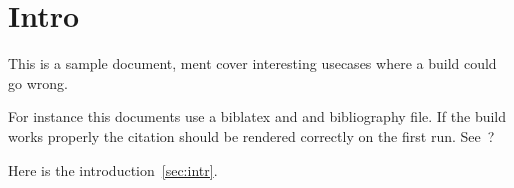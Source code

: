 \documentclass[10pt]{article}
\begin{document}
\section{Intro}\label{sec:intro}
This is a sample document, ment cover interesting usecases where a build could go wrong.

For instance this documents use a biblatex and and bibliography file.
If the build works properly the citation should be rendered correctly on the first run.
See~\cite{shakebuild}?

Here is the introduction~\ref{sec:intr}.

\printbibliography
\end{document}
